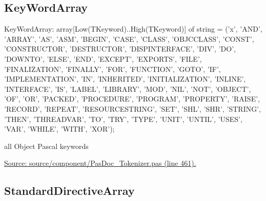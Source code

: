 \documentclass{report}
\newif\ifpdf
\begin{document}
\subsection*{KeyWordArray}
\fi
\label{PasDoc_Tokenizer-KeyWordArray}
\begin{list}{}{
\setlength{\itemindent}{0cm}
\setlength{\listparindent}{0cm}
\setlength{\leftmargin}{\evensidemargin}
\addtolength{\leftmargin}{\tmplength}
\settowidth{\labelsep}{X}
\addtolength{\leftmargin}{\labelsep}
\setlength{\labelwidth}{\tmplength}
}
\item[\textbf{Declaration}\hfill]
\ifpdf
\begin{flushleft}
\fi
\begin{ttfamily}
KeyWordArray: array[Low(TKeyword)..High(TKeyword)] of string =
  ('x', 
    'AND', 'ARRAY', 'AS', 'ASM', 'BEGIN', 'CASE', 'CLASS', 'OBJCCLASS', 'CONST',
    'CONSTRUCTOR', 'DESTRUCTOR', 'DISPINTERFACE', 'DIV',  'DO', 'DOWNTO',
    'ELSE', 'END', 'EXCEPT', 'EXPORTS', 'FILE', 'FINALIZATION',
    'FINALLY', 'FOR', 'FUNCTION', 'GOTO', 'IF', 'IMPLEMENTATION',
    'IN', 'INHERITED', 'INITIALIZATION', 'INLINE', 'INTERFACE',
    'IS', 'LABEL', 'LIBRARY', 'MOD', 'NIL', 'NOT', 'OBJECT', 'OF',
    'OR', 'PACKED', 'PROCEDURE', 'PROGRAM', 'PROPERTY',
    'RAISE', 'RECORD', 'REPEAT', 'RESOURCESTRING', 'SET', 'SHL',
    'SHR', 'STRING', 'THEN', 'THREADVAR', 'TO', 'TRY', 'TYPE',
    'UNIT', 'UNTIL', 'USES', 'VAR', 'WHILE', 'WITH', 'XOR');\end{ttfamily}

\ifpdf
\end{flushleft}
\fi

\par
\item[\textbf{Description}]
all Object Pascal keywords\par
\href{https://github.com/pasdoc/pasdoc/blob/master/source/component/PasDoc_Tokenizer.pas#L461}{Source: source/component/PasDoc{\_}Tokenizer.pas (line 461).}

\end{list}
\ifpdf
\subsection*{\large{\textbf{StandardDirectiveArray}}\normalsize\hspace{1ex}\hrulefill}
\else
\end{document}
